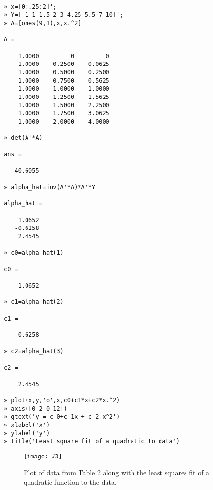 \documentclass[11pt,twoside]{nsf_jwg} %
\newcommand{\sizedfig}[4]{
\begin{figure}[!hbt]
       \centerline{ \texttt{[image: \#3]}}
        \caption{#1}
        \label{#2}
\end{figure}
}
\newcommand{\myfigfour}[0]
{\sizedfig{Plot of data from Table 2 along with the least squares fit of a quadratic function to the data.}{fig4}
{fig4.eps}{4.5in}
}
\begin{document}
\newpage

\large
\begin{verbatim}

» x=[0:.25:2]';
» Y=[ 1 1 1.5 2 3 4.25 5.5 7 10]';
» A=[ones(9,1),x,x.^2]

A =

    1.0000         0         0
    1.0000    0.2500    0.0625
    1.0000    0.5000    0.2500
    1.0000    0.7500    0.5625
    1.0000    1.0000    1.0000
    1.0000    1.2500    1.5625
    1.0000    1.5000    2.2500
    1.0000    1.7500    3.0625
    1.0000    2.0000    4.0000

» det(A'*A)

ans =

   40.6055

» alpha_hat=inv(A'*A)*A'*Y

alpha_hat =

    1.0652
   -0.6258
    2.4545

» c0=alpha_hat(1)

c0 =

    1.0652

» c1=alpha_hat(2)

c1 =

   -0.6258

» c2=alpha_hat(3)

c2 =

    2.4545

» plot(x,y,'o',x,c0+c1*x+c2*x.^2)
» axis([0 2 0 12])
» gtext('y = c_0+c_1x + c_2 x^2')
» xlabel('x')
» ylabel('y')
» title('Least square fit of a quadratic to data')

\end{verbatim}

\myfigfour
\end{document}
